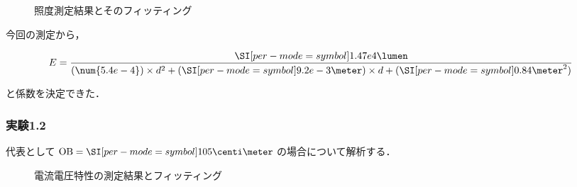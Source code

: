 \documentclass[1_power_supply.tex]{subfiles}
\begin{document}
\begin{figure}[htbp]
	\begin{center}
		\caption{照度測定結果とそのフィッティング}\label{fig:1_dE_fit}
	\end{center}
\end{figure}

今回の測定から，

\begin{align}
	E = \frac{\SIs{1.47e4}{\lumen}}{(\num{5.4e-4})\times d^2+(\SIs{9.2e-3}{\meter})\times d+(\SIs{0.84}{\meter^2})}
\end{align}

と係数を決定できた．

\subsubsection{実験1.2}

代表として$\mathrm{OB}=\SIs{105}{\centi\meter}$の場合について解析する．

\begin{figure}[htbp]
	\begin{center}
		\caption{電流電圧特性の測定結果とフィッティング}\label{fig:1_VI_fit}
	\end{center}
\end{figure}
\end{document}
